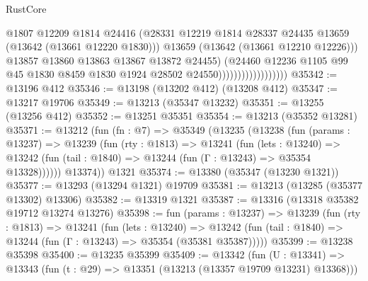 \begin{lexlean}{RustCore}
\begin{coremodule}
                                          @1807
                                          @12209
                                          @1814
                                          @24416
                                          (@28331
                                            @12219
                                            @1814
                                            @28337
                                            @24435
                                            @13659
                                            (@13642 (@13661 @12220 @1830)))
                                          @13659
                                          (@13642 (@13661 @12210 @12226)))
                                        @13857
                                        @13860
                                        @13863
                                        @13867
                                        @13872
                                        @24455)
                                      (@24460
                                        @12236
                                        @1105
                                        @99
                                        @45
                                        @1830
                                        @8459
                                        @1830
                                        @1924
                                        @28502
                                        @24550))))))))))))))))))
@35342 := @13196 @412
@35346 := @13198 (@13202 @412) (@13208 @412)
@35347 := @13217 @19706
@35349 := @13213 (@35347 @13232)
@35351 := @13255 (@13256 @412)
@35352 := @13251 @35351
@35354 := @13213 (@35352 @13281)
@35371 := @13212
    (fun (fn : @7) =>
    @35349
      (@13235
        (@13238
          (fun (params : @13237) =>
          @13239
            (fun (rty : @1813) =>
            @13241
              (fun (lets : @13240) =>
              @13242 (fun (tail : @1840) => @13244 (fun (Γ : @13243) => @35354 @13328))))))
        @13374))
    @1321
@35374 := @13380 (@35347 (@13230 @1321))
@35377 := @13293 (@13294 @1321) @19709
@35381 := @13213 (@13285 (@35377 @13302) @13306)
@35382 := @13319 @1321
@35387 := @13316 (@13318 @35382 @19712 @13274 @13276)
@35398 := fun (params : @13237) =>
  @13239
    (fun (rty : @1813) =>
    @13241
      (fun (lets : @13240) =>
      @13242 (fun (tail : @1840) => @13244 (fun (Γ : @13243) => @35354 (@35381 @35387)))))
@35399 := @13238 @35398
@35400 := @13235 @35399
@35409 := @13342
    (fun (U : @13341) => @13343 (fun (t : @29) => @13351 (@13213 (@13357 @19709 @13231) @13368)))

\end{coremodule}
\end{lexlean}
